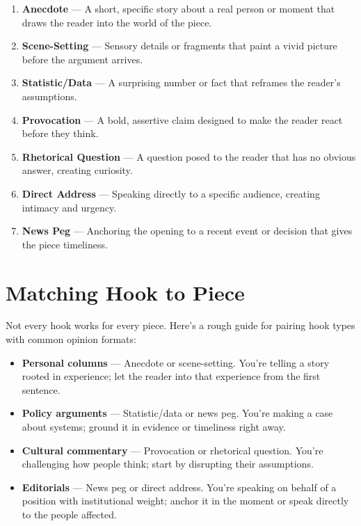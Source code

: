 \documentclass[12pt]{article}
\begin{document}
\begin{tipbox}
\begin{enumerate}[leftmargin=*]
    \item \textbf{Anecdote} --- A short, specific story about a real person or moment that draws the reader into the world of the piece.
    \item \textbf{Scene-Setting} --- Sensory details or fragments that paint a vivid picture before the argument arrives.
    \item \textbf{Statistic/Data} --- A surprising number or fact that reframes the reader's assumptions.
    \item \textbf{Provocation} --- A bold, assertive claim designed to make the reader react before they think.
    \item \textbf{Rhetorical Question} --- A question posed to the reader that has no obvious answer, creating curiosity.
    \item \textbf{Direct Address} --- Speaking directly to a specific audience, creating intimacy and urgency.
    \item \textbf{News Peg} --- Anchoring the opening to a recent event or decision that gives the piece timeliness.
\end{enumerate}
\end{tipbox}

\section*{Matching Hook to Piece}

Not every hook works for every piece. Here's a rough guide for pairing hook types with common opinion formats:

\begin{itemize}[leftmargin=*]
    \item \textbf{Personal columns} --- Anecdote or scene-setting. You're telling a story rooted in experience; let the reader into that experience from the first sentence.
    \item \textbf{Policy arguments} --- Statistic/data or news peg. You're making a case about systems; ground it in evidence or timeliness right away.
    \item \textbf{Cultural commentary} --- Provocation or rhetorical question. You're challenging how people think; start by disrupting their assumptions.
    \item \textbf{Editorials} --- News peg or direct address. You're speaking on behalf of a position with institutional weight; anchor it in the moment or speak directly to the people affected.
\end{itemize}
\end{document}
